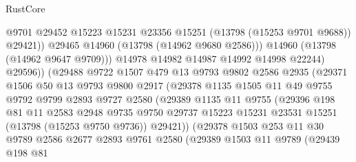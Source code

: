 \begin{lexlean}{RustCore}
\begin{coremodule}
                              @9701
                              @29452
                              @15223
                              @15231
                              @23356
                              @15251
                              (@13798 (@15253 @9701 @9688))
                              @29421))
                          @29465
                          @14960
                          (@13798 (@14962 @9680 @2586)))
                        @14960
                        (@13798 (@14962 @9647 @9709)))
                      @14978
                      @14982
                      @14987
                      @14992
                      @14998
                      @22244)
                    @29596))
                (@29488
                  @9722
                  @1507
                  @479
                  @13
                  @9793
                  @9802
                  @2586
                  @2935
                  (@29371
                    @1506
                    @50
                    @13
                    @9793
                    @9800
                    @2917
                    (@29378
                      @1135
                      @1505
                      @11
                      @49
                      @9755
                      @9792
                      @9799
                      @2893
                      @9727
                      @2580
                      (@29389
                        @1135
                        @11
                        @9755
                        (@29396
                          @198
                          @81
                          @11
                          @2583
                          @2948
                          @9735
                          @9750
                          @29737
                          @15223
                          @15231
                          @23531
                          @15251
                          (@13798 (@15253 @9750 @9736))
                          @29421))
                      (@29378
                        @1503
                        @253
                        @11
                        @30
                        @9789
                        @2586
                        @2677
                        @2893
                        @9761
                        @2580
                        (@29389
                          @1503
                          @11
                          @9789
                          (@29439
                            @198
                            @81

\end{coremodule}
\end{lexlean}

